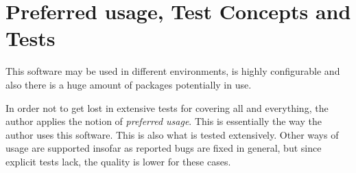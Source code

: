 \chapter{Preferred usage, Test Concepts and Tests}\label{chap:tests}

This software may be used in different environments, 
is highly configurable and 
also there is a huge amount of packages potentially in use. 

In order not to get lost in extensive tests for covering all and everything, 
the author applies the notion of \emph{preferred usage}. 
This is essentially the way the author uses this software. 
This is also what is tested extensively. 
Other ways of usage are supported insofar as reported bugs are fixed in general, 
but since explicit tests lack, the quality is lower for these cases. 

